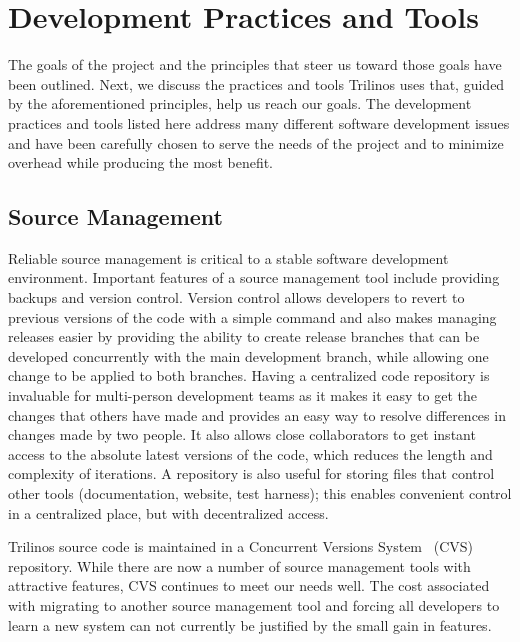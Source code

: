\documentclass{doublecol}
\begin{document}

\section{Development Practices and Tools}
\label{Section:DevelopmentPracticesTools}

The goals of the project and the principles that steer us toward
those goals have been outlined.  Next, we discuss the practices and
tools Trilinos uses that, guided by the aforementioned principles,
help us reach our goals. The development practices and tools listed
here address many different software development issues and have
been carefully chosen to serve the needs of the project and to
minimize overhead while producing the most benefit.


\subsection{Source Management}


Reliable source management is critical to a stable software
development environment.  Important features of a source management
tool include providing backups and version control.  Version control
allows developers to revert to previous versions of the code with a
simple command and also makes managing releases easier by providing
the ability to create release branches that can be developed
concurrently with the main development branch, while allowing one
change to be applied to both branches.  Having a centralized code
repository is invaluable for multi-person development teams as it
makes it easy to get the changes that others have made and provides
an easy way to resolve differences in changes made by two people. It
also allows close collaborators to get instant access to the
absolute latest versions of the code, which reduces the length and
complexity of iterations.  A repository is also useful for storing
files that control other tools (documentation, website, test
harness); this enables convenient control in a centralized place,
but with decentralized access.

Trilinos source code is maintained in a Concurrent Versions
System~\cite{CVS} (CVS) repository.  While there are now a number of
source management tools with attractive features, CVS continues to
meet our needs well.  The cost associated with migrating to another
source management tool and forcing all developers to learn a new
system can not currently be justified by the small gain in features.
\end{document}
